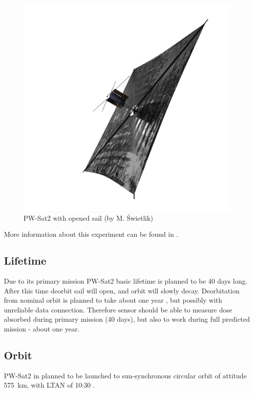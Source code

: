         \begin{figure}[H]
            \centering
            \includegraphics[width=0.7\paperwidth]{img/04/PW-Sat2_render_02.png}
            \caption{PW-Sat2 with opened sail (by M. Świetlik)}
            \label{PW-Sat_render_sail}
        \end{figure}

        More information about this experiment can be found in \cite{DDC_article}.

    \subsection{Lifetime}
        Due to its primary mission PW-Sat2 basic lifetime is planned to be 40 days long. After this time deorbit sail will open, and orbit will slowly decay. Deorbitation from nominal orbit is planned to take about one year \cite{PWSAT_MA_CDR}, but possibly with unreliable data connection. Therefore sensor should be able to measure dose absorbed during primary mission (40 days), but also to work during full predicted mission - about one year.

    \subsection{Orbit}
        PW-Sat2 in planned to be launched to sun-synchronous circular orbit of attitude \SI{575}{\kilo\meter}, with LTAN of 10:30 \cite{PWSAT_MA_CDR}.


